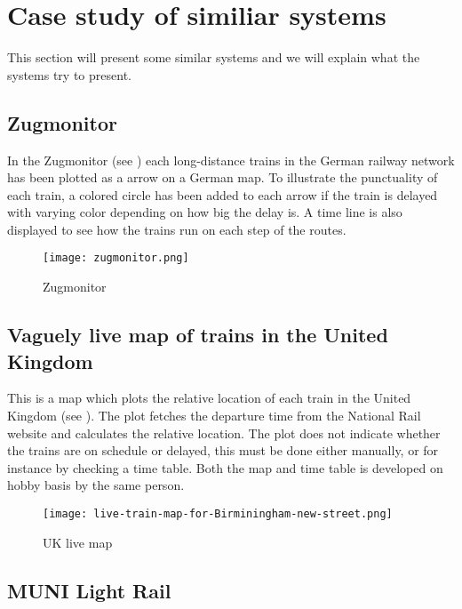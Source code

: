 \clearpage
\section{Case study of similiar systems}
\label{sect:backgroundExamples}
This section will present some similar systems and we will explain what the
systems try to present.
\subsection{Zugmonitor}
\label{sub:subsection_zugmonitor}

In the Zugmonitor (see ) each long-distance 
trains in the German railway network has been plotted as a arrow on a German 
map. To illustrate the punctuality of each train, a colored circle has been 
added to each arrow if the train is delayed with varying color depending on 
how big the delay is. A time line is also displayed to see how the trains run 
on each step of the routes. 

\begin{figure}[!htbp]
	\texttt{[image: zugmonitor.png]}
	\caption[Zugmonitor]{Zugmonitor \cite{zugmonitor}}
	\label{fig:zugmonitor}
\end{figure}

\subsection{Vaguely live map of trains in the United Kingdom}
\label{sub:subsection_ukLiveMap}

This is a map which plots the relative location of each train in the United
Kingdom (see ). The plot fetches the departure time from the 
National Rail website and calculates the relative location. The plot does not
indicate whether the trains are on schedule or delayed, this must be
done either manually, or for instance by checking a time table\cite{trainTimesUK}.
Both the map and time table is developed on hobby basis by the same person. 

\begin{figure}[!htbp]
	\texttt{[image: live-train-map-for-Birminingham-new-street.png]}
	\caption[UK live map]{UK live map \cite{ukLiveMap}}
	\label{fig:ukLiveMap}
\end{figure}

\subsection{MUNI Light Rail}
\label{sub:subsection_muniLightRail}

